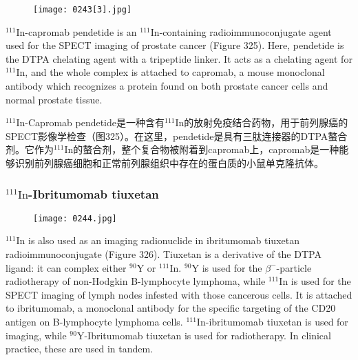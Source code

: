 \documentclass[dvipsnames, svgnames,a4paper,11pt]{article}
\begin{document}
\begin{figure}[h]
	\centering
    \texttt{[image: 0243[3].jpg]}  
     \label{fig325}
\end{figure}

\(\mathrm{^{111}In}\)-capromab pendetide is an \(\mathrm{^{111}In}\)-containing radioimmunoconjugate agent used for the SPECT imaging of prostate cancer (Figure 325). Here, pendetide is the DTPA chelating agent with a tripeptide linker. It acts as a chelating agent for \(\mathrm{^{111}In}\), and the whole complex is attached to capromab, a mouse monoclonal antibody which recognizes a protein found on both prostate cancer cells and normal prostate tissue.

\(\mathrm{^{111}In}\)-Capromab pendetide是一种含有\(\mathrm{^{111}In}\)的放射免疫结合药物，用于前列腺癌的SPECT影像学检查（图325）。在这里，pendetide是具有三肽连接器的DTPA螯合剂。它作为\(\mathrm{^{111}In}\)的螯合剂，整个复合物被附着到capromab上，capromab是一种能够识别前列腺癌细胞和正常前列腺组织中存在的蛋白质的小鼠单克隆抗体。

\subsubsection{\(\mathrm{^{111}In}\)-Ibritumomab tiuxetan}  
\begin{figure}[h]
	\centering
    \texttt{[image: 0244.jpg]}  
     \label{fig326}
\end{figure}


\(\mathrm{^{111}In}\) is also used as an imaging radionuclide in ibritumomab tiuxetan radioimmunoconjugate (Figure 326). Tiuxetan is a derivative of the DTPA ligand: it can complex either \(\mathrm{^{90}Y}\) or \(\mathrm{^{111}In}\). \(\mathrm{^{90}Y}\) is used for the \(\beta^-\)-particle radiotherapy of non-Hodgkin B-lymphocyte lymphoma, while \(\mathrm{^{111}In}\) is used for the SPECT imaging of lymph nodes infested with those cancerous cells. It is attached to ibritumomab, a monoclonal antibody for the specific targeting of the CD20 antigen on B-lymphocyte lymphoma cells. \(\mathrm{^{111}In}\)-ibritumomab tiuxetan is used for imaging, while \(\mathrm{^{90}Y}\)-Ibritumomab tiuxetan is used for radiotherapy. In clinical practice, these are used in tandem.
\end{document}
